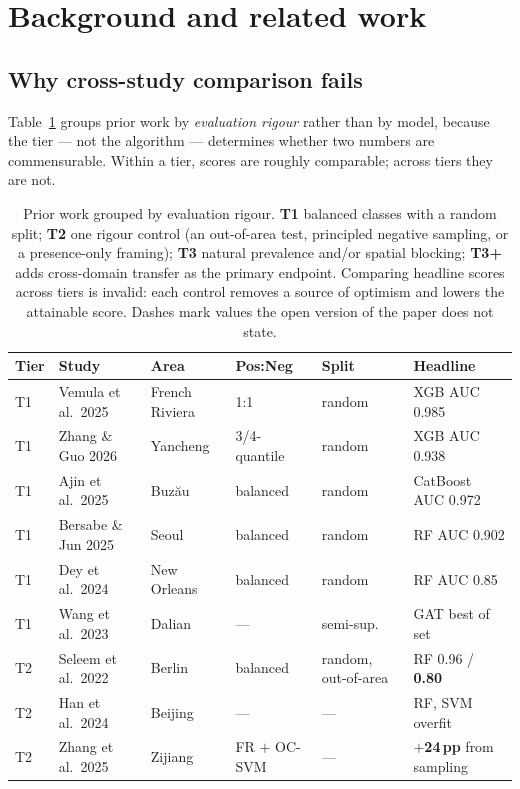 \documentclass[11pt]{article}
\newcommand{\best}[1]{\textbf{#1}}
\begin{document}
\section{Background and related work}\label{sec:related}

\subsection{Why cross-study comparison fails}
Table~\ref{tab:lit} groups prior work by \emph{evaluation rigour} rather than by
model, because the tier --- not the algorithm --- determines whether two numbers
are commensurable. Within a tier, scores are roughly comparable; across tiers
they are not.

\begin{table}[t]
\centering\footnotesize
\setlength{\tabcolsep}{3.5pt}
\caption{Prior work grouped by evaluation rigour. \textbf{T1} balanced classes
with a random split; \textbf{T2} one rigour control (an out-of-area test,
principled negative sampling, or a presence-only framing); \textbf{T3} natural
prevalence and/or spatial blocking; \textbf{T3+} adds cross-domain transfer as
the primary endpoint. Comparing headline scores across tiers is invalid: each
control removes a source of optimism and lowers the attainable score. Dashes
mark values the open version of the paper does not state.}
\label{tab:lit}
\begin{tabular}{@{}llllll@{}}
\toprule
Tier & Study & Area & Pos:Neg & Split & Headline \\
\midrule
T1 & Vemula et al.\ 2025 & French Riviera & 1:1 & random & XGB AUC 0.985 \\
T1 & Zhang \& Guo 2026 & Yancheng & 3/4-quantile & random & XGB AUC 0.938 \\
T1 & Ajin et al.\ 2025 & Buz\u{a}u & balanced & random & CatBoost AUC 0.972 \\
T1 & Bersabe \& Jun 2025 & Seoul & balanced & random & RF AUC 0.902 \\
T1 & Dey et al.\ 2024 & New Orleans & balanced & random & RF AUC 0.85 \\
T1 & Wang et al.\ 2023 & Dalian & --- & semi-sup. & GAT best of set \\
\midrule
T2 & Seleem et al.\ 2022 & Berlin & balanced & random, out-of-area & RF 0.96 / \best{0.80} \\
T2 & Han et al.\ 2024 & Beijing & --- & --- & RF, SVM overfit \\
T2 & Zhang et al.\ 2025 & Zijiang & FR $+$ OC-SVM & --- & \best{$+$24\,pp} from sampling \\

\end{tabular}
\end{table}
\end{document}
